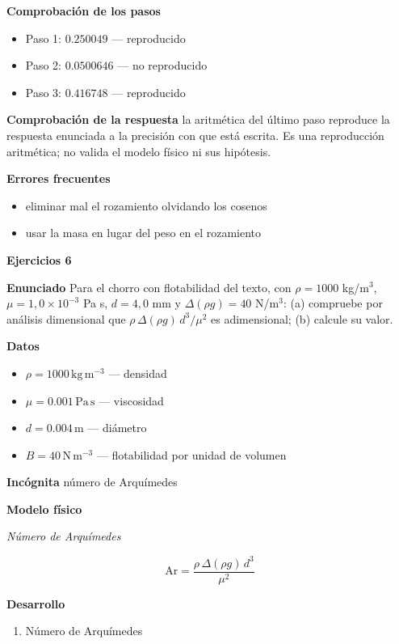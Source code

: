\documentclass[10pt,openany]{book}
\begin{document}
\noindent\textbf{Comprobación de los pasos}
\begin{itemize}
\item Paso 1: $0.250049$ — reproducido
\item Paso 2: $0.0500646$ — no reproducido
\item Paso 3: $0.416748$ — reproducido
\end{itemize}

\noindent\textbf{Comprobación de la respuesta} la aritmética del último paso reproduce la respuesta enunciada a la precisión con que está escrita. Es una reproducción aritmética; no valida el modelo físico ni sus hipótesis.

\noindent\textbf{Errores frecuentes}
\begin{itemize}
\item eliminar mal el rozamiento olvidando los cosenos
\item usar la masa en lugar del peso en el rozamiento
\end{itemize}

\noindent\textbf{Ejercicios 6}

\noindent\textbf{Enunciado}
Para el chorro con flotabilidad del texto, con \(\rho = 1000\) kg/m\(^3\), \(\mu = 1{,}0\times 10^{-3}\) Pa s, \(d = 4{,}0\) mm y \(\Delta(\rho g) = 40\) N/m\(^3\): (a) compruebe por análisis dimensional que \(\rho\,\Delta(\rho g)\,d^{3}/\mu^{2}\) es adimensional; (b) calcule su valor.

\noindent\textbf{Datos}
\begin{itemize}
\item $\rho = 1000\,\mathrm{kg}\,\mathrm{m}^{-3}$ — densidad
\item $\mu = 0.001\,\mathrm{Pa}\,\mathrm{s}$ — viscosidad
\item $d = 0.004\,\mathrm{m}$ — diámetro
\item $B = 40\,\mathrm{N}\,\mathrm{m}^{-3}$ — flotabilidad por unidad de volumen
\end{itemize}

\noindent\textbf{Incógnita}
número de Arquímedes

\noindent\textbf{Modelo físico}

\noindent\textit{Número de Arquímedes}

\[
\mathrm{Ar} = \frac{\rho\,\Delta(\rho g)\,d^{3}}{\mu^{2}}
\]

\noindent\textbf{Desarrollo}
\begin{enumerate}
\item
Número de Arquímedes
\end{enumerate}
\end{document}
